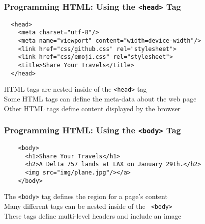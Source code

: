 \documentclass[14pt,aspectratio=169]{beamer}
\begin{document}
%
\begin{frame}[fragile]
  \frametitle{Programming HTML: Using the {\tt <head>} Tag}
  \normalsize
  \hspace*{-.25in}
  \begin{minipage}{6in}
    \vspace*{.25in}
    \begin{verbatim}
  <head>
    <meta charset="utf-8"/>
    <meta name="viewport" content="width=device-width"/>
    <link href="css/github.css" rel="stylesheet">
    <link href="css/emoji.css" rel="stylesheet">
    <title>Share Your Travels</title>
  </head>
    \end{verbatim}
  \end{minipage}
  \vspace*{.05in}
  \begin{center}
    \normalsize \noindent HTML tags are nested inside of the {\tt <head>} tag\\
    \normalsize \noindent Some HTML tags can define the meta-data about the web page \\
    \normalsize \noindent Other HTML tags define content displayed by the
    browser \\
  \end{center}
\end{frame}

%
\begin{frame}[fragile]
  \frametitle{Programming HTML: Using the {\tt <body>} Tag}
  \normalsize
  \hspace*{-.25in}
  \begin{minipage}{6in}
    \vspace*{.25in}
    \begin{verbatim}
    <body>
      <h1>Share Your Travels</h1>
      <h2>A Delta 757 lands at LAX on January 29th.</h2>
      <img src="img/plane.jpg"/></a>
    </body>
    \end{verbatim}
  \end{minipage}
  \vspace*{.05in}
  \begin{center}
    \normalsize \noindent The {\tt <body>} tag defines the region for a page's
    content\\
    \normalsize \noindent Many different tags can be nested inside of the {\tt
    <body>} \\
    \normalsize \noindent These tags define multi-level headers and include an
    image\\
  \end{center}
\end{frame}
\end{document}
